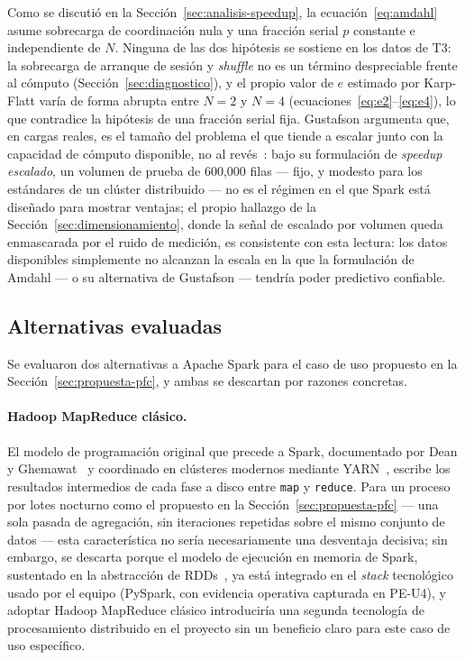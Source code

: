 \documentclass[11pt,a4paper]{article}
\begin{document}
    Como se discutió en la Sección~\ref{sec:analisis-speedup}, la
    ecuación~\eqref{eq:amdahl} asume sobrecarga de coordinación nula y una
    fracción serial $p$ constante e independiente de $N$. Ninguna de las
    dos hipótesis se sostiene en los datos de T3: la sobrecarga de
    arranque de sesión y \emph{shuffle} no es un término despreciable
    frente al cómputo (Sección~\ref{sec:diagnostico}), y el propio valor
    de $e$ estimado por Karp-Flatt varía de forma abrupta entre $N=2$ y
    $N=4$ (ecuaciones~\eqref{eq:e2}--\eqref{eq:e4}), lo que contradice la
    hipótesis de una fracción serial fija. Gustafson argumenta que, en
    cargas reales, es el tamaño del problema el que tiende a escalar junto
    con la capacidad de cómputo disponible, no al revés~\cite{gustafson1988}:
    bajo su formulación de \emph{speedup escalado}, un volumen de prueba
    de 600{,}000 filas --- fijo, y modesto para los estándares de un
    clúster distribuido --- no es el régimen en el que Spark está diseñado
    para mostrar ventajas; el propio hallazgo de la
    Sección~\ref{sec:dimensionamiento}, donde la señal de escalado por
    volumen queda enmascarada por el ruido de medición, es consistente con
    esta lectura: los datos disponibles simplemente no alcanzan la escala
    en la que la formulación de Amdahl --- o su alternativa de Gustafson
    --- tendría poder predictivo confiable.

    \subsection{Alternativas evaluadas}

    Se evaluaron dos alternativas a Apache Spark para el caso de uso
    propuesto en la Sección~\ref{sec:propuesta-pfc}, y ambas se descartan
    por razones concretas.

    \paragraph{Hadoop MapReduce clásico.} El modelo de programación
    original que precede a Spark, documentado por Dean y
    Ghemawat~\cite{dean2008} y coordinado en clústeres modernos mediante
    YARN~\cite{vavilapalli2013}, escribe los resultados intermedios de
    cada fase a disco entre \texttt{map} y \texttt{reduce}. Para un
    proceso por lotes nocturno como el propuesto en la
    Sección~\ref{sec:propuesta-pfc} --- una sola pasada de agregación,
    sin iteraciones repetidas sobre el mismo conjunto de datos --- esta
    característica no sería necesariamente una desventaja decisiva; sin
    embargo, se descarta porque el modelo de ejecución en memoria de
    Spark, sustentado en la abstracción de RDDs~\cite{zaharia2012}, ya
    está integrado en el \emph{stack} tecnológico usado por el equipo
    (PySpark, con evidencia operativa capturada en PE-U4), y adoptar
    Hadoop MapReduce clásico introduciría una segunda tecnología de
    procesamiento distribuido en el proyecto sin un beneficio claro para
    este caso de uso específico.
\end{document}
